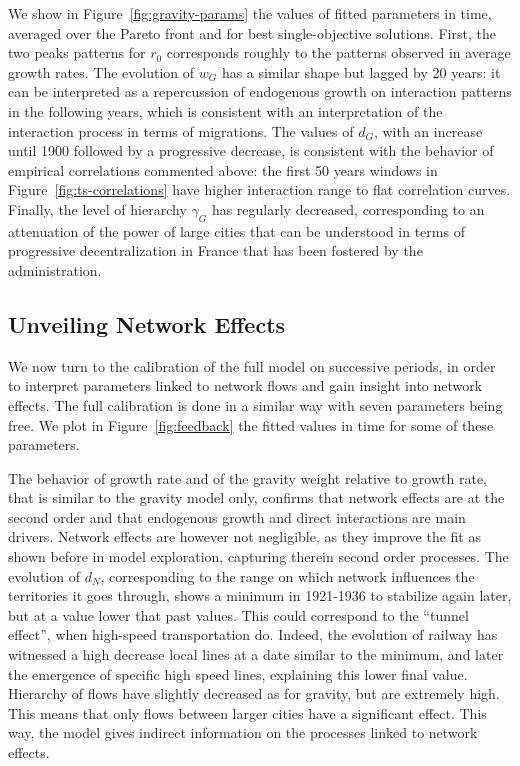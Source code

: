 \documentclass[Royal,sageh,times]{sagej}
\begin{document}
We show in Figure~\ref{fig:gravity-params} the values of fitted parameters in time, averaged over the Pareto front and for best single-objective solutions. First, the two peaks patterns for $r_0$ corresponds roughly to the patterns observed in average growth rates. The evolution of $w_G$ has a similar shape but lagged by 20 years: it can be interpreted as a repercussion of endogenous growth on interaction patterns in the following years, which is consistent with an interpretation of the interaction process in terms of migrations. The values of $d_G$, with an increase until 1900 followed by a progressive decrease, is consistent with the behavior of empirical correlations commented above: the first 50 years windows in Figure~\ref{fig:ts-correlations} have  higher interaction range  to flat correlation curves. Finally, the level of hierarchy $\gamma_G$ has regularly decreased, corresponding to an attenuation of the power of large cities that can be understood in terms of  progressive decentralization in France that has been fostered by the administration.





\subsection*{Unveiling Network Effects}

We now turn to the calibration of the full model on successive periods, in order to interpret parameters linked to network flows and gain insight into network effects. The full calibration is done in a similar way with seven parameters being free. We plot in Figure~\ref{fig:feedback} the fitted values in time for some of these parameters.

The behavior of growth rate and of the gravity weight relative to growth rate, that is similar to the gravity model only, confirms that network effects are  at the second order and that endogenous growth and direct interactions are main drivers. Network effects are however not negligible, as they improve the fit as shown before in model exploration, capturing therein second order processes. The evolution of $d_N$, corresponding to the range on which network influences the territories it goes through, shows a minimum in 1921-1936 to stabilize again later, but at a value lower that past values. This could correspond to the ``tunnel effect'', when high-speed transportation do. Indeed, the evolution of railway has witnessed a high decrease  local lines at a date similar to the minimum, and later the emergence of specific high speed lines, explaining this lower final value. Hierarchy of flows have slightly decreased as for gravity, but are extremely high. This means that only flows between larger cities have a significant effect. This way, the model gives indirect information on the processes linked to network effects.
\end{document}
